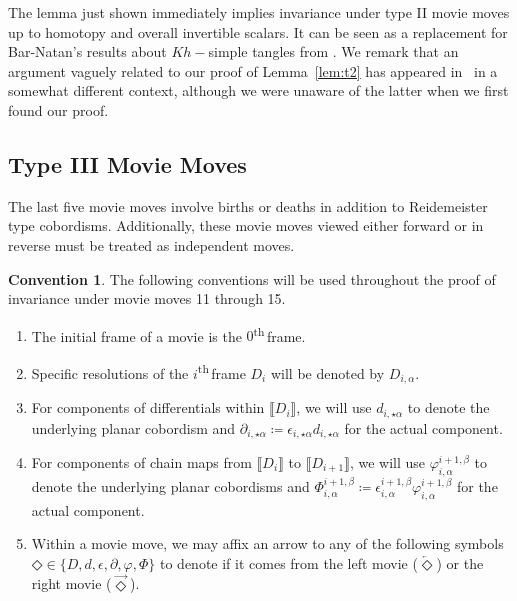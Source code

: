 \documentclass[12pt]{amsart}
\theoremstyle{definition}
\newtheorem{convention}{Convention}
\theoremstyle{plain}
\newcommand{\ordth}{\textsuperscript{th}\,}
\begin{document}
The lemma just shown immediately implies invariance
 under type II movie moves up to 
 homotopy and overall invertible scalars.
 It can be seen as a replacement for Bar-Natan's results about $Kh-$simple tangles from
 \cite{Bn2005}.
 We remark that an argument vaguely related to
 our proof 
 of Lemma~\ref{lem:t2} 
 has appeared in~\cite{Sa2018} in a somewhat different context, although we were unaware of the
 latter when we first found our proof.
 
 
\subsection{Type III Movie Moves}

The last five movie moves involve births or deaths in addition to Reidemeister type cobordisms.  Additionally, these movie moves viewed either forward or in reverse must be treated as independent moves.  
\begin{convention} The following conventions will be used throughout the proof of invariance under movie moves 11 through 15.
    \begin{enumerate}[label=\textnormal{\bf{\alph*.}}]
        \item The initial frame of a movie is the $0$\ordth frame.
        \item Specific resolutions of the $i$\ordth frame $D_i$ will be denoted by $D_{i,\alpha}$.
        \item For components of differentials within $\llbracket D_i\rrbracket$, we will use
        $d_{i,{\star}\alpha}$ to denote the underlying planar cobordism and $\partial_{i,{\star}\alpha}\coloneqq\epsilon_{i,{\star}\alpha}d_{i,{\star}\alpha}$ for the actual component.
        \item For components of chain maps from $\llbracket D_i\rrbracket$ to $\llbracket D_{i+1}\rrbracket$, we will use $\varphi_{i,\alpha}^{i+1,\beta}$ to denote the underlying planar cobordisms and $\Phi_{i,\alpha}^{i+1,\beta}\coloneqq\epsilon_{i,\alpha}^{i+1,\beta}\varphi_{i,\alpha}^{i+1,\beta}$ for the actual component.
        \item Within a movie move, we may affix an arrow to any of the following symbols $\mathbin{\Diamond}\in\{D,d,\epsilon,\partial,\varphi,\Phi\}$
        to denote if it comes from the left movie ($\overleftarrow{\mathbin{\Diamond}}$) or the right movie ($\overrightarrow{\mathbin{\Diamond}}$).
    \end{enumerate}
\end{convention}
\end{document}
